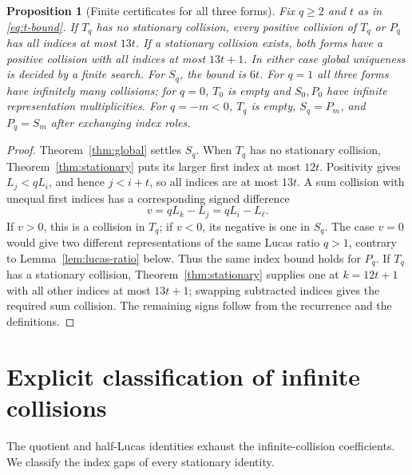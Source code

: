 \documentclass[11pt]{article}
\newtheorem{proposition}[theorem]{Proposition}
\begin{document}
\begin{proposition}[Finite certificates for all three forms]
\label{prop:finiteTP}
Fix \(q\ge2\) and \(t\) as in \eqref{eq:t-bound}.
If \(T_q\) has no stationary collision, every positive
collision of \(T_q\) or \(P_q\) has all indices at most
\(13t\). If a stationary collision exists, both forms
have a positive collision with all indices at most
\(13t+1\). In either case global uniqueness is decided
by a finite search. For \(S_q\), the bound is \(6t\).
For \(q=1\) all three forms have infinitely many
collisions; for \(q=0\), \(T_0\) is empty and \(S_0,P_0\)
have infinite representation multiplicities. For
\(q=-m<0\), \(T_q\) is empty, \(S_q=P_m\), and
\(P_q=S_m\) after exchanging index roles.
\end{proposition}
\begin{proof}
Theorem~\ref{thm:global} settles \(S_q\).
When \(T_q\) has no stationary collision,
Theorem~\ref{thm:stationary} puts its larger first index
at most \(12t\). Positivity gives \(L_j<qL_i\), and
hence \(j<i+t\), so all indices are at most \(13t\).
A sum collision with unequal first indices
has a corresponding signed difference
\[
v=qL_k-L_j=qL_i-L_\ell.
\]
If \(v>0\), this is a collision in \(T_q\); if
\(v<0\), its negative is one in \(S_q\).
The case \(v=0\) would give two different
representations of the same Lucas ratio \(q>1\),
contrary to Lemma~\ref{lem:lucas-ratio} below.
Thus the same index bound holds for \(P_q\).
If \(T_q\) has a stationary collision,
Theorem~\ref{thm:stationary} supplies one at
\(k=12t+1\) with all other indices at most
\(13t+1\); swapping subtracted indices
gives the required sum collision.
The remaining signs follow from the recurrence
and the definitions.
\end{proof}

\section{Explicit classification of infinite collisions}
The quotient and half-Lucas identities exhaust the infinite-collision
coefficients. We classify the index gaps of every stationary identity.
\end{document}
